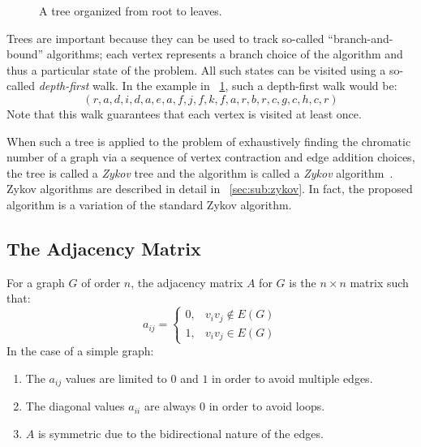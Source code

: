 \begin{figure}[H]
  \centering
  \caption{A tree organized from root to leaves.}
  \label{fig:tree}
\end{figure}

Trees are important because they can be used to track so-called ``branch-and-bound'' algorithms; each vertex
represents a branch choice of the algorithm and thus a particular state of the problem.  All such states can be
visited using a so-called \emph{depth-first} walk.  In the example in \figurename~\ref{fig:tree}, such a
depth-first walk would be:
\[(r,a,d,i,d,a,e,a,f,j,f,k,f,a,r,b,r,c,g,c,h,c,r)\]
Note that this walk guarantees that each vertex is visited at least once.

When such a tree is applied to the problem of exhaustively finding the chromatic number of a graph via a sequence
of vertex contraction and edge addition choices, the tree is called a \emph{Zykov} tree and the algorithm is called
a \emph{Zykov} algorithm~\cite{mcdiarmid}.  Zykov algorithms are described in detail in
\sectionname~\ref{sec:sub:zykov}.  In fact, the proposed algorithm is a variation of the standard Zykov algorithm.

\subsection{The Adjacency Matrix}\label{sec:sub:adjacency}

For a graph \(G\) of order \(n\), the adjacency matrix \(A\) for \(G\) is the \(n\times n\) matrix such that:
\[a_{ij}=\begin{cases}
0, & v_iv_j\notin E(G) \\
1, & v_iv_j\in E(G)
\end{cases}\]
In the case of a simple graph:
\begin{enumerate}
\item The \(a_{ij}\) values are limited to \(0\) and \(1\) in order to avoid multiple edges.
\item The diagonal values \(a_{ii}\) are always \(0\) in order to avoid loops.
\item \(A\) is symmetric due to the bidirectional nature of the edges.
\end{enumerate}

